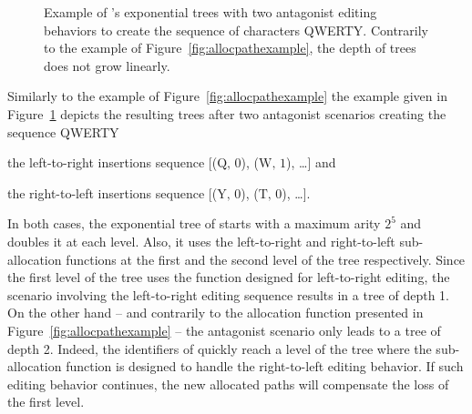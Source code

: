 \begin{figure}
  \centering
  \caption{\label{fig:lseqtreeexample} Example of \LSEQ's exponential trees with
    two antagonist editing behaviors to create the sequence of characters
    QWERTY. Contrarily to the example of Figure~\ref{fig:allocpathexample}, the
    depth of trees does not grow linearly.}
\end{figure}


Similarly to the example of Figure~\ref{fig:allocpathexample} the example given
in Figure~\ref{fig:lseqtreeexample} depicts the resulting trees after two
antagonist scenarios creating the sequence QWERTY
\begin{inparaenum}[(i)]
\item the left-to-right insertions sequence [($\text{Q},\,0$), ($\text{W},\,1$),
  \ldots] and
\item the right-to-left insertions sequence [($\text{Y},\,0$), ($\text{T},\,0$),
  \ldots].
\end{inparaenum}
In both cases, the exponential tree of \LSEQ starts with a maximum arity $2^5$
and doubles it at each level. Also, it uses the left-to-right and right-to-left
sub-allocation functions at the first and the second level of the tree
respectively. Since the first level of the tree uses the function designed for
left-to-right editing, the scenario involving the left-to-right editing sequence
results in a tree of depth 1. On the other hand -- and contrarily to the
allocation function presented in Figure~\ref{fig:allocpathexample} -- the
antagonist scenario only leads to a tree of depth 2. Indeed, the identifiers of
\LSEQ quickly reach a level of the tree where the sub-allocation function is
designed to handle the right-to-left editing behavior. If such editing behavior
continues, the new allocated paths will compensate the loss of the first level.


